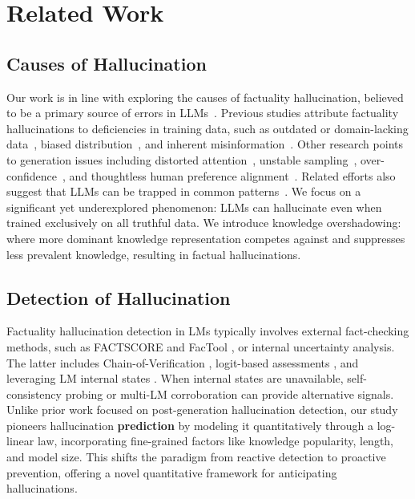 \section{Related Work}

\subsection{Causes of Hallucination}
Our work is in line with exploring the causes of factuality hallucination, believed to be a primary source of errors in LLMs~\cite{li2024dawn, augenstein2023factuality}. Previous studies attribute factuality hallucinations to deficiencies in training data, such as outdated or domain-lacking data~\cite{zhang-etal-2023-vibe, Livska2022StreamingQAAB, luu-etal-2022-time, zhang-etal-2021-howyoutagtweets, zhang2022time}, biased distribution~\cite{ladhak-etal-2023-pre, qin2024does}, and inherent misinformation~\cite{dziri-etal-2022-origin, liu2024prejudicevolatilitystatisticalframework}. Other research points to generation issues 
including distorted attention~\cite{aralikatte-etal-2021-focus}, unstable sampling~\cite{manakul-etal-2023-selfcheckgpt}, over-confidence~\cite{varshney2023stitch, ren2023investigating, li2024survey}, and thoughtless human preference alignment~\cite{wei2023simple, zhang2025amulet, bai2024efficient}.
Related efforts also suggest that LLMs can be trapped in common patterns~\cite{lin-etal-2022-truthfulqa, kang2023impact, kandpal2023large}.
We focus on a significant yet underexplored phenomenon: LLMs can hallucinate even when trained exclusively on all truthful data. 
We introduce knowledge overshadowing: where more dominant knowledge representation competes against and suppresses less prevalent knowledge, resulting in factual hallucinations.
\subsection{Detection of Hallucination}
Factuality hallucination detection in LMs typically involves external fact-checking methods, such as FACTSCORE \citep{min2023factscore} and FacTool \citep{chern2023factool}, or internal uncertainty analysis. The latter includes Chain-of-Verification \citep{dhuliawala2023chain}, logit-based assessments \citep{kadavath2022language,zhang2024self}, and leveraging LM internal states \citep{varshney2023stitch,luo2023zero}. When internal states are unavailable, self-consistency probing \citep{manakul2023selfcheckgpt,agrawal2024language} or multi-LM corroboration \citep{cohen2023lm} can provide alternative signals.
Unlike prior work focused on post-generation hallucination detection, our study pioneers hallucination \textbf{prediction} by modeling it quantitatively through a log-linear law, incorporating fine-grained factors like knowledge popularity, length, and model size. This shifts the paradigm from reactive detection to proactive prevention, offering a novel quantitative framework for anticipating hallucinations.


